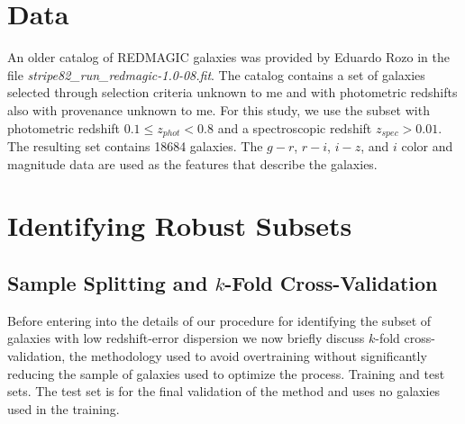 \documentclass[preprint]{aastex}
\begin{document}
\section{Data}
An older catalog of REDMAGIC galaxies was provided by Eduardo Rozo in the file {\it stripe82\_\-run\_\-redmagic-1.0-08.fit}.
The catalog contains a set of galaxies selected through selection criteria unknown to me and with photometric redshifts
also with provenance unknown to me.  For this study, we use the subset with photometric redshift $0.1\le z_{phot} < 0.8$
and a spectroscopic redshift $z_{spec}>0.01$.   The resulting set contains 18684 galaxies. 
The $g-r$, $r-i$, $i-z$, and $i$ color and magnitude data are used
as the features that describe the galaxies.


\section{Identifying Robust Subsets}
\subsection{Sample Splitting and $k$-Fold Cross-Validation}
Before entering into the details of our procedure for identifying the subset of galaxies with low redshift-error dispersion
we now briefly discuss $k$-fold cross-validation, the methodology used to avoid overtraining without significantly reducing
the sample of galaxies used to optimize the process.  Training and test sets.  The test set is for the final validation of the method
and uses no galaxies used in the training.  
\end{document}

